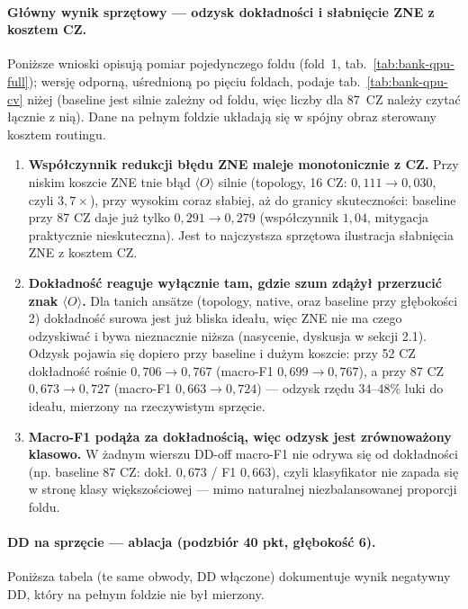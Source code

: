 \documentclass[11pt,a4paper]{article}
\begin{document}
\paragraph{Główny wynik sprzętowy --- odzysk dokładności i słabnięcie ZNE z kosztem CZ.}
Poniższe wnioski opisują pomiar pojedynczego foldu (fold~1, tab.~\ref{tab:bank-qpu-full});
wersję odporną, uśrednioną po pięciu foldach, podaje tab.~\ref{tab:bank-qpu-cv} niżej (baseline
jest silnie zależny od foldu, więc liczby dla 87~CZ należy czytać łącznie z nią). Dane na
pełnym foldzie układają się w spójny obraz sterowany kosztem routingu.

\begin{enumerate}
\item \textbf{Współczynnik redukcji błędu ZNE maleje monotonicznie z CZ.} Przy niskim koszcie
      ZNE tnie błąd $\langle O\rangle$ silnie (topology, 16 CZ: $0{,}111\to0{,}030$, czyli
      $3{,}7\times$), przy wysokim coraz słabiej, aż do granicy skuteczności: baseline przy
      87 CZ daje już tylko $0{,}291\to0{,}279$ (współczynnik $1{,}04$, mitygacja praktycznie
      nieskuteczna). Jest to najczystsza sprzętowa ilustracja słabnięcia ZNE z kosztem CZ.
\item \textbf{Dokładność reaguje wyłącznie tam, gdzie szum zdążył przerzucić znak
      $\langle O\rangle$.} Dla tanich ansätze (topology, native, oraz baseline przy
      głębokości 2) dokładność surowa jest już bliska ideału, więc ZNE nie ma czego
      odzyskiwać i bywa nieznacznie niższa (nasycenie, dyskusja w sekcji 2.1). Odzysk pojawia
      się dopiero przy baseline i dużym koszcie: przy 52 CZ dokładność rośnie
      $0{,}706\to0{,}767$ (macro-F1 $0{,}699\to0{,}767$), a przy 87 CZ $0{,}673\to0{,}727$
      (macro-F1 $0{,}663\to0{,}724$) --- odzysk rzędu $34$--$48\%$ luki do ideału, mierzony na
      rzeczywistym sprzęcie.
\item \textbf{Macro-F1 podąża za dokładnością, więc odzysk jest zrównoważony klasowo.}
      W żadnym wierszu DD-off macro-F1 nie odrywa się od dokładności (np. baseline 87 CZ:
      dokł. $0{,}673$ / F1 $0{,}663$), czyli klasyfikator nie zapada się w stronę klasy
      większościowej --- mimo naturalnej niezbalansowanej proporcji foldu.
\end{enumerate}


\paragraph{DD na sprzęcie --- ablacja (podzbiór 40 pkt, głębokość 6).}
Poniższa tabela (te same obwody, DD włączone) dokumentuje wynik negatywny DD, który na
pełnym foldzie nie był mierzony.
\end{document}
